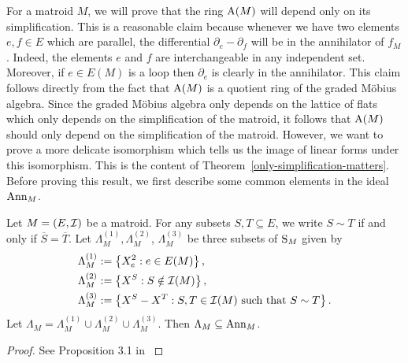 \documentclass{puthesis-UG}
\begin{document}
For a matroid $M$, we will prove that the ring $\operatorname{A}(M)$ will depend only on its simplification. This is a reasonable claim because whenever we have two elements $e, f \in E$ which are parallel, the differential $\partial_e - \partial_f$ will be in the annihilator of $f_M$. Indeed, the elements $e$ and $f$ are interchangeable in any independent set. Moreover, if $e \in E(M)$ is a loop then $\partial_e$ is clearly in the annihilator. This claim follows directly from the fact that $\operatorname{A}(M)$ is a quotient ring of the graded M\"obius algebra. Since the graded M\"obius algebra only depends on the lattice of flats which only depends on the simplification of the matroid, it follows that $\operatorname{A}(M)$ should only depend on the simplification of the matroid. However, we want to prove a more delicate isomorphism which tells us the image of linear forms under this isomorphism. This is the content of Theorem~\ref{only-simplification-matters}. Before proving this result, we first describe some common elements in the ideal $\operatorname{Ann}_M$. 

\begin{prop}
	Let $M = (E, \mathcal{I})$ be a matroid. For any subsets $S, T \subseteq E$, we write $S \sim T$ if and only if $\overline{S} = \overline{T}$. Let $\Lambda_M^{(1)}, \Lambda_M^{(2)}$, $\Lambda_M^{(3)}$ be three subsets of $\operatorname{S}_M$ given by 
	\begin{align*}
		\Lambda_M^{(1)} & := \left \{X_e^2 : e \in E(M) \right \}, \\
		\Lambda_M^{(2)} & := \left \{X^S : S \notin \mathcal{I}(M) \right \}, \\
		\Lambda_M^{(3)} & := \left \{X^S - X^T : S, T \in \mathcal{I}(M) \text{ such that } S \sim T \right \}.
	\end{align*}
	Let $\Lambda_M = \Lambda_M^{(1)} \cup \Lambda_M^{(2)} \cup \Lambda_M^{(3)}$. Then $\Lambda_M \subseteq \operatorname{Ann}_M$. 
\end{prop}

\begin{proof}
	See Proposition 3.1 in \cite{MN-gorenstein}
\end{proof}
\end{document}

